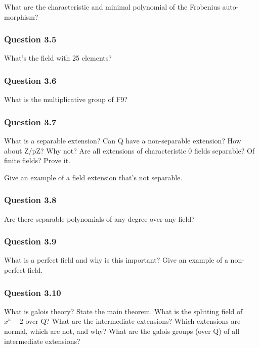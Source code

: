 What are the characteristic and minimal polynomial of the Frobenius
auto- morphism?

\hypertarget{question-3.5}{%
\subsubsection{Question 3.5}\label{question-3.5}}

What's the field with 25 elements?

\hypertarget{question-3.6}{%
\subsubsection{Question 3.6}\label{question-3.6}}

What is the multiplicative group of F9?

\hypertarget{question-3.7}{%
\subsubsection{Question 3.7}\label{question-3.7}}

What is a separable extension? Can Q have a non-separable extension? How
about Z/pZ? Why not? Are all extensions of characteristic 0 fields
separable? Of finite fields? Prove it.

Give an example of a field extension that's not separable.

\hypertarget{question-3.8}{%
\subsubsection{Question 3.8}\label{question-3.8}}

Are there separable polynomials of any degree over any field?

\hypertarget{question-3.9}{%
\subsubsection{Question 3.9}\label{question-3.9}}

What is a perfect field and why is this important? Give an example of a
non-perfect field.

\hypertarget{question-3.10}{%
\subsubsection{Question 3.10}\label{question-3.10}}

What is galois theory? State the main theorem. What is the splitting
field of \(x^5 - 2\) over Q? What are the intermediate extensions? Which
extensions are normal, which are not, and why? What are the galois
groups (over Q) of all intermediate extensions?

